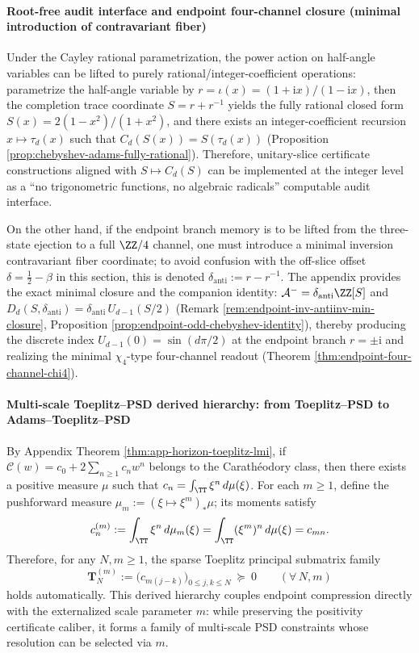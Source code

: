 \paragraph{Root-free audit interface and endpoint four-channel closure (minimal introduction of contravariant fiber)}
Under the Cayley rational parametrization, the power action on half-angle variables can be lifted to purely rational/integer-coefficient operations: parametrize the half-angle variable by
\(
r=\iota(x)=(1+\mathrm{i}x)/(1-\mathrm{i}x)
\),
then the completion trace coordinate \(S=r+r^{-1}\) yields the fully rational closed form \(S(x)=2(1-x^{2})/(1+x^{2})\), and there exists an integer-coefficient recursion \(x\mapsto\tau_d(x)\) such that \(C_d(S(x))=S(\tau_d(x))\) (Proposition \ref{prop:chebyshev-adams-fully-rational}).
Therefore, unitary-slice certificate constructions aligned with \(S\mapsto C_d(S)\) can be implemented at the integer level as a ``no trigonometric functions, no algebraic radicals'' computable audit interface.
\par
On the other hand, if the endpoint branch memory is to be lifted from the three-state ejection to a full \(\ZZ/4\) channel, one must introduce a minimal inversion contravariant fiber coordinate; to avoid confusion with the off-slice offset \(\delta=\tfrac12-\beta\) in this section, this is denoted
\(
\delta_{\mathrm{anti}}:=r-r^{-1}
\).
The appendix provides the exact minimal closure and the companion identity:
\(
\mathcal A^{-}=\delta_{\mathrm{anti}}\ZZ[S]
\)
and
\(
D_d(S,\delta_{\mathrm{anti}})=\delta_{\mathrm{anti}}\,U_{d-1}(S/2)
\)
(Remark \ref{rem:endpoint-inv-antiinv-min-closure}, Proposition \ref{prop:endpoint-odd-chebyshev-identity}), thereby producing the discrete index \(U_{d-1}(0)=\sin(d\pi/2)\) at the endpoint branch \(r=\pm\mathrm{i}\) and realizing the minimal \(\chi_4\)-type four-channel readout (Theorem \ref{thm:endpoint-four-channel-chi4}).

\paragraph{Multi-scale Toeplitz--PSD derived hierarchy: from Toeplitz--PSD to Adams--Toeplitz--PSD}
By Appendix Theorem \ref{thm:app-horizon-toeplitz-lmi}, if \(\mathscr{C}(w)=c_0+2\sum_{n\ge 1}c_n w^n\) belongs to the Carath\'eodory class, then there exists a positive measure \(\mu\) such that
\(
c_n=\int_{\TT}\xi^n\,d\mu(\xi)
\).
For each \(m\ge 1\), define the pushforward measure \(\mu_m:=(\xi\mapsto \xi^m)_*\mu\); its moments satisfy
\[
c^{(m)}_n:=\int_{\TT}\xi^n\,d\mu_m(\xi)=\int_{\TT}(\xi^m)^n\,d\mu(\xi)=c_{mn}.
\]
Therefore, for any \(N,m\ge 1\), the sparse Toeplitz principal submatrix family
\begin{equation}\label{eq:xi-adams-toeplitz-psd}
\boxed{\;
\mathbf{T}^{(m)}_N
:=\bigl(c_{m(j-k)}\bigr)_{0\le j,k\le N}\ \succeq\ 0\qquad(\forall\,N,m)\;}
\end{equation}
holds automatically.
This derived hierarchy couples endpoint compression directly with the externalized scale parameter \(m\): while preserving the positivity certificate caliber, it forms a family of multi-scale PSD constraints whose resolution can be selected via \(m\).

